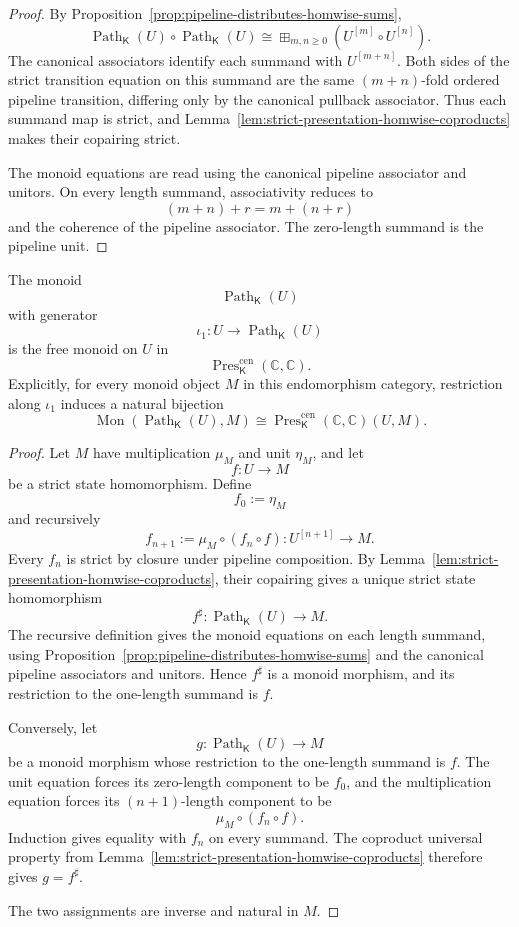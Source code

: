 \begin{proof}
By Proposition~\ref{prop:pipeline-distributes-homwise-sums},
\[
\operatorname{Path}_{\mathsf K}(U)
\circ
\operatorname{Path}_{\mathsf K}(U)
\cong
\boxplus_{m,n\geq0}
\left(
    U^{[m]}\circ U^{[n]}
\right).
\]
The canonical associators identify each summand with \(U^{[m+n]}\).
Both sides of the strict transition equation on this summand are the same
\((m+n)\)-fold ordered pipeline transition, differing only by the canonical
pullback associator.  Thus each summand map is strict, and
Lemma~\ref{lem:strict-presentation-homwise-coproducts} makes their copairing
strict.

The monoid equations are read using the canonical pipeline associator and
unitors.  On every length summand, associativity reduces to
\[
    (m+n)+r=m+(n+r)
\]
and the coherence of the pipeline associator.  The zero-length summand is the
pipeline unit.
\end{proof}

\begin{theorem}
\label{thm:free-effectful-path-monoid}
The monoid
\[
    \operatorname{Path}_{\mathsf K}(U)
\]
with generator
\[
    \iota_1:
    U\to\operatorname{Path}_{\mathsf K}(U)
\]
is the free monoid on \(U\) in
\[
    \operatorname{Pres}^{\mathrm{cen}}_{\mathsf K}
    (\mathbb C,\mathbb C).
\]
Explicitly, for every monoid object \(M\) in this endomorphism category,
restriction along \(\iota_1\) induces a natural bijection
\[
\operatorname{Mon}
\left(
    \operatorname{Path}_{\mathsf K}(U),
    M
\right)
\cong
\operatorname{Pres}^{\mathrm{cen}}_{\mathsf K}
(\mathbb C,\mathbb C)(U,M).
\]
\end{theorem}

\begin{proof}
Let \(M\) have multiplication \(\mu_M\) and unit \(\eta_M\), and let
\[
    f:U\to M
\]
be a strict state homomorphism.  Define
\[
    f_0:=\eta_M
\]
and recursively
\[
    f_{n+1}
    :=
    \mu_M
    \circ
    (f_n\circ f):
    U^{[n+1]}\to M.
\]
Every \(f_n\) is strict by closure under pipeline composition.  By
Lemma~\ref{lem:strict-presentation-homwise-coproducts}, their copairing gives
a unique strict state homomorphism
\[
    f^\sharp:
    \operatorname{Path}_{\mathsf K}(U)
    \longrightarrow
    M.
\]
The recursive definition gives the monoid equations on each length summand,
using
Proposition~\ref{prop:pipeline-distributes-homwise-sums}
and the canonical pipeline associators and unitors.  Hence
\(f^\sharp\) is a monoid morphism, and its restriction to the one-length
summand is \(f\).

Conversely, let
\[
    g:
    \operatorname{Path}_{\mathsf K}(U)
    \longrightarrow
    M
\]
be a monoid morphism whose restriction to the one-length summand is \(f\).
The unit equation forces its zero-length component to be \(f_0\), and the
multiplication equation forces its \((n+1)\)-length component to be
\[
    \mu_M\circ(f_n\circ f).
\]
Induction gives equality with \(f_n\) on every summand.  The coproduct
universal property from
Lemma~\ref{lem:strict-presentation-homwise-coproducts} therefore gives
\(g=f^\sharp\).

The two assignments are inverse and natural in \(M\).
\end{proof}

